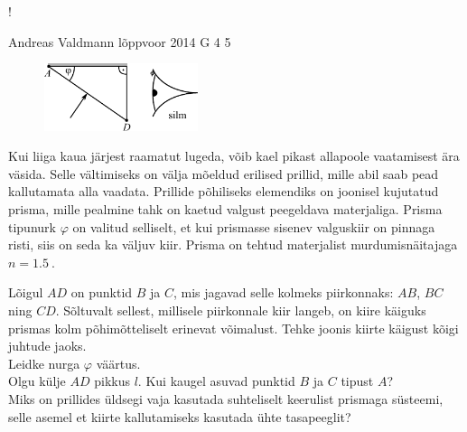 \documentclass[11pt]{article}
\begin{document}
{{\begin{resizebox}{\linewidth}{!}{
		}
\end{resizebox}
\fi
}

{Andreas Valdmann} %
{lõppvoor} %
{2014} %
{G 4} %
{5} %
{
\ifStatement
\begin{figure}
 \begin{center}
 \includegraphics[width=0.4\textwidth]{2014-v3g-04-periskoopprillid_yl_joonis.pdf}
 \end{center}
\end{figure}

Kui liiga kaua järjest raamatut lugeda, võib kael pikast allapoole vaatamisest ära väsida. Selle vältimiseks on välja mõeldud erilised prillid, mille abil saab pead kallutamata alla vaadata. Prillide põhiliseks elemendiks on joonisel kujutatud prisma, mille pealmine tahk on kaetud valgust peegeldava materjaliga. Prisma tipunurk $\varphi$ on valitud selliselt, et kui prismasse sisenev valguskiir on pinnaga risti, siis on seda ka väljuv kiir. Prisma on tehtud materjalist murdumisnäitajaga $n=\SI{1,5}{}$. 

\osa Lõigul $AD$ on punktid $B$ ja $C$, mis jagavad selle kolmeks piirkonnaks: $AB$, $BC$ ning $CD$. Sõltuvalt sellest, millisele piirkonnale kiir langeb, on kiire käiguks prismas kolm põhimõtteliselt erinevat võimalust. Tehke joonis kiirte käigust kõigi juhtude jaoks.\\
\osa Leidke nurga $\varphi$ väärtus.\\
\osa Olgu külje $AD$ pikkus $l$. Kui kaugel asuvad punktid $B$ ja $C$ tipust $A$?\\
\osa Miks on prillides üldsegi vaja kasutada suhteliselt keerulist prismaga süsteemi, selle asemel et kiirte kallutamiseks kasutada ühte tasapeeglit?
\fi
}

}
\end{document}
